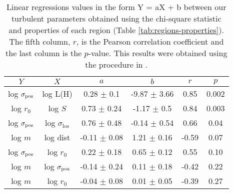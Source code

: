 \begin{table*}
\begin{center}
\caption{Linear regressions values in the form Y = aX + b between our turbulent parameters obtained using the chi-square statistic and properties of each region (Table \ref{tab:regions-properties}). The fifth column, $r$, is the Pearson correlation coefficient and the last column is the $p$-value. This results were obtained using the procedure in \citet{2007ApJ...665.1489K}.}
\begin{tabular}{cccccc}
\hline
            $Y$ &                   $X$ &                 $a$ &                 $b$ &       $r$ &      $p$ \\
\hline
 log $\sigma_{\mathrm{pos}}$ &            log L(H) &   0.28 $\pm$ 0.1 &  -9.87 $\pm$ 3.66 &   0.85 &  0.002 \\
    log $r_0$ &             log $S$ &   0.73 $\pm$ 0.24 &  -1.17 $\pm$ 0.5 &   0.84 &  0.003 \\
 log $\sigma_{\mathrm{pos}}$ &  log $\sigma_{\text{los}}$ &   0.76 $\pm$ 0.48 &  -0.14 $\pm$ 0.54 &   0.66 &   0.04 \\
      log $m$ &            log dist &  -0.11 $\pm$ 0.08 &   1.21 $\pm$ 0.16 &  -0.59 &   0.07 \\
 log $\sigma_{\mathrm{pos}}$ &         log $r_{0}$ &   0.22 $\pm$ 0.18 &   0.65 $\pm$ 0.12 &   0.55 &  0.10 \\
      log $m$ &        log $\sigma_{\mathrm{pos}}$ &  -0.14 $\pm$ 0.24 &   0.11 $\pm$ 0.18 &  -0.42 &  0.22 \\
      log $m$ &         log $r_{0}$ &  -0.04 $\pm$ 0.08 &   0.01 $\pm$ 0.05 &  -0.39 &   0.27 \\
\bottomrule
\end{tabular}\label{tab:RestStats}
\end{center}
\end{table*}


